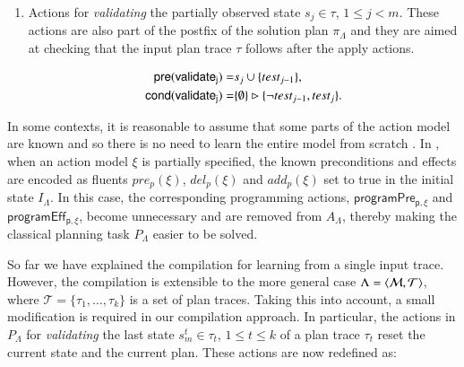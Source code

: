 \begin{itemize}
\begin{enumerate}
\item Actions for {\em validating} the partially observed state $s_j\in\tau$, {\tt\small $1\leq j< m$}. These actions are also part of the postfix of the solution plan $\pi_\Lambda$ and they are aimed at checking that the input plan trace $\tau$ follows after the apply actions.


\begin{small}
\begin{align*}
\hspace*{7pt}\mathsf{pre}(\mathsf{validate_{j}})=&s_j\cup\{test_{j-1}\},\\
\mathsf{cond}(\mathsf{validate_{j}})=&\{\emptyset\}\rhd\{\neg test_{j-1}, test_j\}.
\end{align*}
\end{small}
\end{enumerate}
\end{itemize}


In some contexts, it is reasonable to assume that some parts of the action model are known and so there is no need to learn the entire model from scratch \cite{ZhuoNK13}. In \FAMA, when an action model $\xi$ is partially specified, the known preconditions and effects are encoded as fluents $pre_p(\xi)$, $del_p(\xi)$ and $add_p(\xi)$ set to true in the initial state $I_{\Lambda}$. In this case, the corresponding programming actions, $\mathsf{programPre_{p,\xi}}$ and $\mathsf{programEff_{p,\xi}}$, become unnecessary and are removed from $A_{\Lambda}$, thereby making the classical planning task $P_{\Lambda}$ easier to be solved.


So far we have explained the compilation for learning from a single input trace. However, the compilation is extensible to the more general case $\Lambda={\langle \mathcal{M},\mathcal{T} \rangle}$, where $\mathcal{T}=\{\tau_1,\ldots,\tau_k\}$ is a set of plan traces. Taking this into account, a small modification is required in our compilation approach. In particular, the actions in $P_{\Lambda}$ for {\em validating} the last state $s_m^t\in \tau_t$, {\tt\small $1\leq t\leq k$} of a plan trace $\tau_t$ reset the current state and the current plan. These actions are now redefined as:


